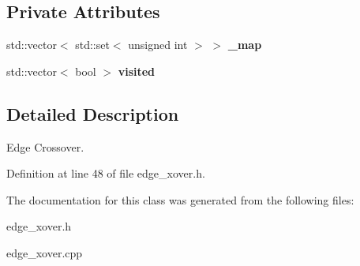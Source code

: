\subsection*{Private Attributes}
\begin{CompactItemize}
\item 
std::vector$<$ std::set$<$ unsigned int $>$ $>$ \bf{\_\-map}\label{class_edge_xover_7d9272c12cfa55df4677d5ad837a0e5c}

\item 
std::vector$<$ bool $>$ \bf{visited}\label{class_edge_xover_46d4d4724cf6d660b1a7ab4a346573d4}

\end{CompactItemize}


\subsection{Detailed Description}
Edge Crossover. 



Definition at line 48 of file edge\_\-xover.h.

The documentation for this class was generated from the following files:\begin{CompactItemize}
\item 
edge\_\-xover.h\item 
edge\_\-xover.cpp\end{CompactItemize}
